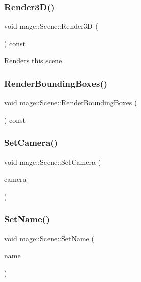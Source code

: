 \subsubsection{\texorpdfstring{Render3\+D()}{Render3D()}}
{\footnotesize\ttfamily void mage\+::\+Scene\+::\+Render3D (\begin{DoxyParamCaption}{ }\end{DoxyParamCaption}) const}

Renders this scene. \hypertarget{classmage_1_1_scene_a522bdeaff61129f6df93345a3eef693f}{}\label{classmage_1_1_scene_a522bdeaff61129f6df93345a3eef693f} 
\subsubsection{\texorpdfstring{Render\+Bounding\+Boxes()}{RenderBoundingBoxes()}}
{\footnotesize\ttfamily void mage\+::\+Scene\+::\+Render\+Bounding\+Boxes (\begin{DoxyParamCaption}{ }\end{DoxyParamCaption}) const}

\hypertarget{classmage_1_1_scene_a7568ec0884d04812af2f70990c8ec80d}{}\label{classmage_1_1_scene_a7568ec0884d04812af2f70990c8ec80d} 
\subsubsection{\texorpdfstring{Set\+Camera()}{SetCamera()}}
{\footnotesize\ttfamily void mage\+::\+Scene\+::\+Set\+Camera (\begin{DoxyParamCaption}\item[{\hyperlink{namespacemage_a1e01ae66713838a7a67d30e44c67703e}{Shared\+Ptr}$<$ \hyperlink{classmage_1_1_camera_node}{Camera\+Node} $>$}]{camera }\end{DoxyParamCaption})}

\hypertarget{classmage_1_1_scene_a9b7c1c2f84cc3b3c5ff3de4f29d830e9}{}\label{classmage_1_1_scene_a9b7c1c2f84cc3b3c5ff3de4f29d830e9} 
\subsubsection{\texorpdfstring{Set\+Name()}{SetName()}\hspace{0.1cm}{\footnotesize\ttfamily [1/2]}}
{\footnotesize\ttfamily void mage\+::\+Scene\+::\+Set\+Name (\begin{DoxyParamCaption}\item[{const string \&}]{name }\end{DoxyParamCaption})}

